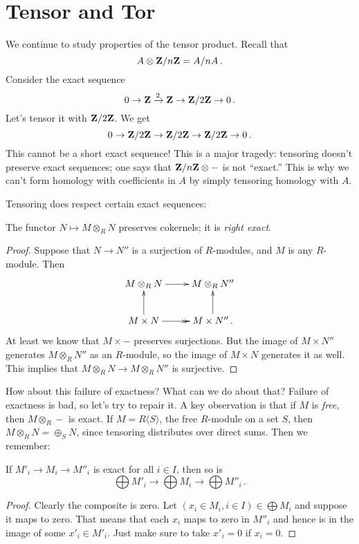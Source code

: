 \section{Tensor and Tor}

We continue to study properties of the tensor product. Recall that 
\[
A\otimes \mathbf Z/n\mathbf Z=A/nA\,.
\]
Consider the exact sequence 
\[
0\to \mathbf Z\xrightarrow{2}\mathbf Z\to \mathbf Z/2\mathbf Z\to 0\,.
\]
Let's tensor it with $\mathbf Z/2\mathbf Z$. We get
\[
0\to \mathbf Z/2\mathbf Z\to\mathbf Z/2\mathbf Z\to\mathbf Z/2\mathbf Z\to 0\,.
\]
This cannot be a short exact sequence! 
This is a major tragedy: tensoring doesn't preserve exact sequences; one says that $\mathbf Z/n\mathbf Z\otimes-$ is not ``exact.'' This is why we can't form homology with coefficients in $A$ by simply tensoring homology with $A$. 

Tensoring does respect certain exact sequences:
\begin{prop}
The functor $N\mapsto M\otimes_R N$ preserves cokernels; it is \emph{right exact}. 
\end{prop}
\begin{proof}
Suppose that $N\to N''$ is a surjection of $R$-modules, and $M$ is any $R$-module. Then 
\[
\xymatrix{
M\otimes_RN \ar[r] & M\otimes_RN'' \\
M\times N \ar[u] \ar@{->>}[r] & M\times N'' \ar[u]\,.
}\]
At least we know that $M\times-$ preserves surjections. But the image of 
$M\times N''$ generates $M\otimes_RN''$ as an $R$-module, so the image of
$M\times N$ generates it as well. This implies that 
$M\otimes_RN\to M\otimes_RN''$ is surjective.
\end{proof}

How about this failure of exactness? What can we do about that? Failure of exactness is bad, so let's try to repair it. A key observation is that if 
$M$ is {\em free}, then $M\otimes_R-$ is exact. If $M=R\langle S\rangle$, the
free $R$-module on a set $S$, then $M\otimes_RN=\oplus_SN$, since tensoring
distributes over direct sums. Then we remember:
\begin{lemma}
If $M'_i\to M_i\to M''_i$ is exact for all $i\in I$, then so is 
\[
\bigoplus M'_i\to\bigoplus M_i\to\bigoplus M''_i\,.
\]
\end{lemma}
\begin{proof} Clearly the composite is zero. Let 
$(x_i\in M_i,i\in I)\in\bigoplus M_i$ and suppose it maps to zero. 
That means that each $x_i$ maps to zero in $M''_i$ and hence is in the
image of some $x'_i\in M'_i$. Just make sure to take $x'_i=0$ if $x_i=0$. 
\end{proof}

